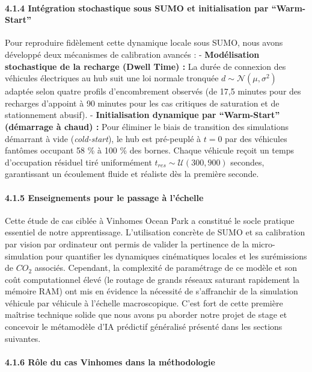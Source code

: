 \documentclass[10pt, a4paper]{article}
\begin{document}
\paragraph{4.1.4 Intégration stochastique sous SUMO et initialisation
par
``Warm-Start''}\label{intuxe9gration-stochastique-sous-sumo-et-initialisation-par-warm-start}

Pour reproduire fidèlement cette dynamique locale sous SUMO, nous avons
développé deux mécanismes de calibration avancés : -
\textbf{Modélisation stochastique de la recharge (Dwell Time) :} La
durée de connexion des véhicules électriques au hub suit une loi normale
tronquée \(d \sim \mathcal{N}(\mu, \sigma^2)\) adaptée selon quatre
profils d'encombrement observés (de 17,5 minutes pour des recharges
d'appoint à 90 minutes pour les cas critiques de saturation et de
stationnement abusif). - \textbf{Initialisation dynamique par
``Warm-Start'' (démarrage à chaud) :} Pour éliminer le biais de
transition des simulations démarrant à vide (\emph{cold-start}), le hub
est pré-peuplé à \(t=0\) par des véhicules fantômes occupant 58 \% à 100
\% des bornes. Chaque véhicule reçoit un temps d'occupation résiduel
tiré uniformément \(t_{res} \sim \mathcal{U}(300, 900)\) secondes,
garantissant un écoulement fluide et réaliste dès la première seconde.

\paragraph{4.1.5 Enseignements pour le passage à
l'échelle}\label{enseignements-pour-le-passage-uxe0-luxe9chelle}

Cette étude de cas ciblée à Vinhomes Ocean Park a constitué le socle
pratique essentiel de notre apprentissage. L'utilisation concrète de
SUMO et sa calibration par vision par ordinateur ont permis de valider
la pertinence de la micro-simulation pour quantifier les dynamiques
cinématiques locales et les surémissions de \(CO_2\) associés.
Cependant, la complexité de paramétrage de ce modèle et son coût
computationnel élevé (le routage de grands réseaux saturant rapidement
la mémoire RAM) ont mis en évidence la nécessité de s'affranchir de la
simulation véhicule par véhicule à l'échelle macroscopique. C'est fort
de cette première maîtrise technique solide que nous avons pu aborder
notre projet de stage et concevoir le métamodèle d'IA prédictif
généralisé présenté dans les sections suivantes.

\paragraph{4.1.6 Rôle du cas Vinhomes dans la
méthodologie}\label{ruxf4le-du-cas-vinhomes-dans-la-muxe9thodologie}
\end{document}
